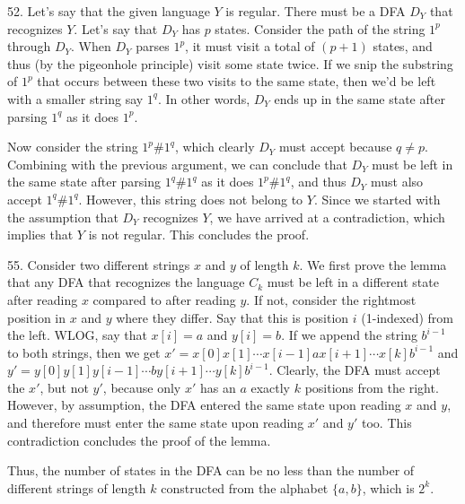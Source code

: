 \documentclass{article}
\begin{document}
52. Let's say that the given language $Y$ is regular. There must be a DFA $D_Y$ that recognizes $Y$. Let's say that $D_Y$ has $p$ states. Consider the path of the string $1^p$ through $D_Y$. When $D_Y$ parses $1^p$, it must visit a total of $(p + 1)$ states, and thus (by the pigeonhole principle) visit some state twice. If we snip the substring of $1^p$ that occurs between these two visits to the same state, then we'd be left with a smaller string say $1^q$. In other words, $D_Y$ ends up in the same state after parsing $1^q$ as it does $1^p$.

Now consider the string $1^p \# 1^q$, which clearly $D_Y$ must accept because $q \ne p$. Combining with the previous argument, we can conclude that $D_Y$ must be left in the same state after parsing $1^q \# 1^q$ as it does $1^p \# 1^q$, and thus $D_Y$ must also accept $1^q \# 1^q$. However, this string does not belong to $Y$. Since we started with the assumption that $D_Y$ recognizes $Y$, we have arrived at a contradiction, which implies that $Y$ is not regular. This concludes the proof.

55. Consider two different strings $x$ and $y$ of length $k$. We first prove the lemma that any DFA that recognizes the language $C_k$ must be left in a different state after reading $x$ compared to after reading $y$. If not, consider the rightmost position in $x$ and $y$ where they differ. Say that this is position $i$ (1-indexed) from the left. WLOG, say that $x[i] = a$ and $y[i] = b$. If we append the string $b^{i - 1}$ to both strings, then we get $x' = x[0] x[1] \cdots x[i - 1] a x[i + 1] \cdots x[k] b^{i - 1}$ and $y' = y[0] y[1] y[i - 1] \cdots b y[i + 1] \cdots y[k] b^{i - 1}$. Clearly, the DFA must accept the $x'$, but not $y'$, because only $x'$ has an $a$ exactly $k$ positions from the right. However, by assumption, the DFA entered the same state upon reading $x$ and $y$, and therefore must enter the same state upon reading $x'$ and $y'$ too. This contradiction concludes the proof of the lemma.

Thus, the number of states in the DFA can be no less than the number of different strings of length $k$ constructed from the alphabet $\{a, b\}$, which is $2^k$.
\end{document}
